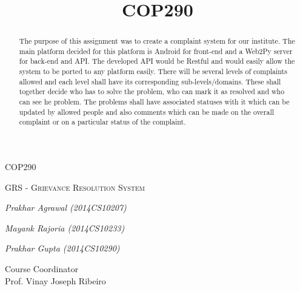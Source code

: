 \documentclass[12pt]{article}
\begin{document}
\begin{titlepage}
\title{COP290}
\centering
{\scshape\Large COP290\par}
\vspace{1cm}
{\scshape\Huge GRS - Grievance Resolution System\par}


\vspace{3cm}
  {\Large\itshape Prakhar Agrawal (2014CS10207)\par}
\vspace{0.3cm}
  {\Large\itshape Mayank Rajoria (2014CS10233)\par}
\vspace{0.3cm}
  {\Large\itshape Prakhar Gupta (2014CS10290)\par}


\vfill
\raggedleft
Course  Coordinator\\
Prof. Vinay Joseph Ribeiro
\end{titlepage}

\begin{abstract}
The purpose of this assignment was to create a complaint system for our institute. The main platform decided for this platform is Android for front-end and a Web2Py server for back-end and API. The developed API would be Restful and would easily allow the system to be ported to any platform easily. There will be several levels of complaints allowed and each level shall have its corresponding sub-levels/domains. These shall together decide who has to solve the problem, who can mark it as resolved and who can see he problem. The problems shall have associated statuses with it which can be updated by allowed people and also comments which can be made on the overall complaint or on a particular status of the complaint.
\end{abstract}


\end{document}

